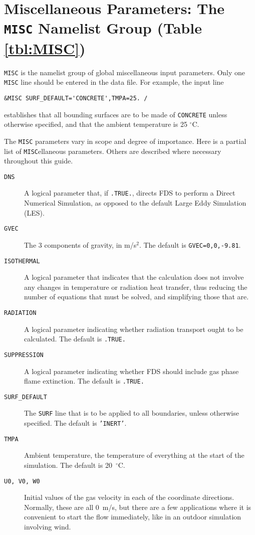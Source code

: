 \documentclass[11pt]{book}
\newcommand{\ct}{\tt\small}
\begin{document}
\clearpage
\section{Miscellaneous Parameters: The \texorpdfstring{{\tt MISC}}{MISC} Namelist Group (Table \ref{tbl:MISC})}
\label{info:MISC}

{\ct MISC} is the namelist group of global miscellaneous input parameters.
Only one {\ct MISC} line should be entered in the data file. For example, the input line

\footnotesize
\begin{verbatim}
&MISC SURF_DEFAULT='CONCRETE',TMPA=25. /
\end{verbatim}
\normalsize

\noindent
establishes that all bounding surfaces are to be made of {\ct CONCRETE} unless
otherwise specified, and that
the ambient temperature is 25 $^\circ$C.

The {\ct MISC} parameters vary in scope and degree of importance. Here is a partial list of {\ct MISC}ellaneous parameters. Others are described where necessary throughout this
guide.

\begin{description}
\item[{\ct DNS}] A logical parameter that, if {\ct .TRUE.}, directs FDS to perform a Direct Numerical Simulation, as opposed to the default Large Eddy Simulation (LES).
\item[{\ct GVEC}] The 3 components of gravity, in m/s$^2$. The default is {\ct GVEC=0,0,-9.81}.
\item[{\ct ISOTHERMAL}] A logical parameter that indicates that the calculation does not involve any changes in temperature or
radiation heat transfer, thus reducing the number of equations that must be solved, and simplifying those that are.
\item[{\ct RADIATION}] A logical parameter indicating whether radiation transport ought to be calculated. The default is {\ct .TRUE.}
\item[{\ct SUPPRESSION}] A logical parameter indicating whether FDS should include gas phase flame extinction. The default is {\ct .TRUE.}
\item[{\ct SURF\_DEFAULT}] The {\ct SURF} line that is to be applied to all boundaries, unless otherwise specified. The default is {\ct 'INERT'}.
\item[{\ct TMPA}] Ambient temperature, the temperature of everything at the start of the simulation. The default is 20~$^\circ$C.
\item[{\ct U0, V0, W0}] Initial values of the gas velocity in each of the coordinate directions. Normally, these are all 0~m/s, but there are a few applications where it is
convenient to start the flow immediately, like in an outdoor simulation involving wind.
\end{description}
\end{document}
